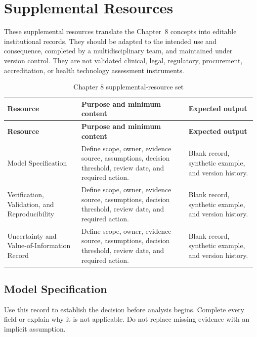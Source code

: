 \section{Supplemental Resources}
\label{sec:comp-ch08-supplemental}

These supplemental resources translate the Chapter~8 concepts into editable
institutional records. They should be adapted to the intended use and consequence,
completed by a multidisciplinary team, and maintained under version control. They
are not validated clinical, legal, regulatory, procurement, accreditation, or health
technology assessment instruments.

\begin{longtable}{@{}p{}p{}p{}@{}}
\caption{Chapter 8 supplemental-resource set}
\label{tab:comp-ch08-supplemental-set}\\
\toprule
\textbf{Resource} & \textbf{Purpose and minimum content} & \textbf{Expected output} \\
\midrule
\endfirsthead
\toprule
\textbf{Resource} & \textbf{Purpose and minimum content} & \textbf{Expected output} \\
\midrule
\endhead
\bottomrule
\endlastfoot
Model Specification & Define scope, owner, evidence source, assumptions, decision threshold, review date, and required action. & Blank record, synthetic example, and version history. \\
Verification, Validation, and Reproducibility & Define scope, owner, evidence source, assumptions, decision threshold, review date, and required action. & Blank record, synthetic example, and version history. \\
Uncertainty and Value-of-Information Record & Define scope, owner, evidence source, assumptions, decision threshold, review date, and required action. & Blank record, synthetic example, and version history. \\
\end{longtable}

\subsection{Model Specification}
\label{sec:comp-ch08-supp-1}
Use this record to establish the decision before analysis begins. Complete every
field or explain why it is not applicable. Do not replace missing evidence with an
implicit assumption.

